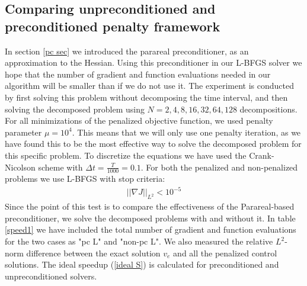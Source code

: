 \subsection{Comparing unpreconditioned and preconditioned penalty framework}
In section \ref{pc sec} we introduced the parareal preconditioner, as an approximation to the Hessian. Using this preconditioner in our L-BFGS solver we hope that the number of gradient and function evaluations needed in our algorithm will be smaller than if we do not use it. The experiment is conducted by first solving this problem without decomposing the time interval, and then solving the decomposed problem using $N=2,4,8,16,32,64,128$ decompositions. For all minimizations of the penalized objective function, we used penalty parameter $\mu=10^4$. This means that we will only use one penalty iteration, as we have found this to be the most effective way to solve the decomposed problem for this specific problem. To discretize the equations we have used the Crank-Nicolson scheme with $\Delta t= \frac{T}{1000}=0.1$. For both the penalized and non-penalized problems we use L-BFGS with stop criteria:
\begin{align*}
||\nabla J||_{L^2} <10^{-5}
\end{align*}  
Since the point of this test is to compare the effectiveness of the Parareal-based preconditioner, we solve the decomposed problems with and without it. In table \ref{speed1} we have included the total number of gradient and function evaluations for the two cases as "pc L" and "non-pc L". We also measured the relative $L^2$-norm difference between the exact solution $v_e$ and all the penalized control solutions. The ideal speedup (\ref{ideal S}) is calculated for preconditioned and unpreconditioned solvers.
\\
\\
